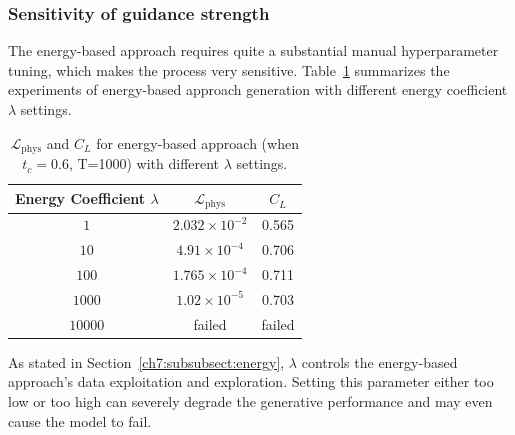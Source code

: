 \subsubsection{Sensitivity of guidance strength}
\label{ch7:subsect:diversity}
The energy-based approach requires quite a substantial manual hyperparameter tuning, which makes the process very sensitive. Table~\ref{ch7:tab:energy_diff_lambda} summarizes the experiments of energy-based approach generation with different energy coefficient $\lambda$ settings.  
\begin{table}[htbp]
    \centering
    \caption{$\mathcal{L}_{\mathrm{phys}}$ and $C_L$ for energy-based approach (when $t_c = 0.6$, T=1000) with different $\lambda$ settings.}
    \label{ch7:tab:energy_diff_lambda}
    \begin{tabular}{c c c}
        \toprule
        Energy Coefficient $\lambda$ & $\mathcal{L}_{\mathrm{phys}}$ & $C_L$ \\
        \midrule
        $1$      & $2.032 \times 10^{-2}$  & 0.565  \\
        $10$     &  $4.91 \times 10^{-4}$ & 0.706  \\
        $100$    &  $1.765 \times 10^{-4}$& 0.711\\
        $1000$   & $1.02 \times 10^{-5}$ & 0.703 \\
        $10000$  & failed & failed\\
        \bottomrule
    \end{tabular}
\end{table}
As stated in Section~\ref{ch7:subsubsect:energy}, $\lambda$ controls the energy-based approach's data exploitation and exploration. Setting this parameter either too low or too high can severely degrade the generative performance and may even cause the model to fail.


